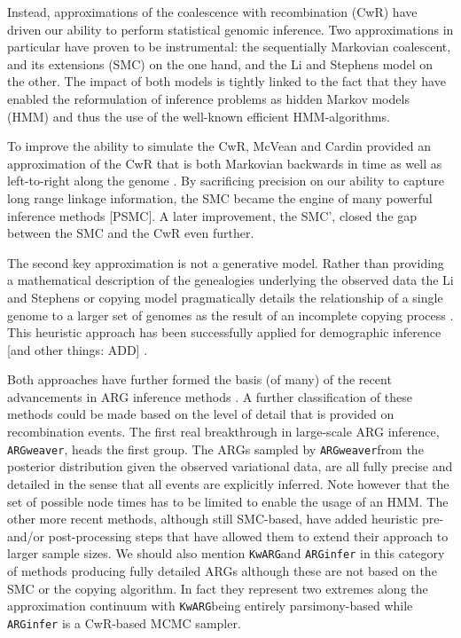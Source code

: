 \documentclass{article}
\newcommand{\kwarg}[0]{\texttt{KwARG}}
\newcommand{\argweaver}[0]{\texttt{ARGweaver}}
\begin{document}
Instead, approximations of the coalescence with recombination (CwR) have
driven our ability to perform statistical genomic inference. Two approximations
in particular have proven to be instrumental: the sequentially Markovian coalescent,
and its extensions (SMC) on the one hand, and the Li and Stephens model on the other.
The impact of both models is tightly linked to the fact that they have enabled
the reformulation of inference problems as hidden Markov models (HMM) and thus
the use of the well-known efficient HMM-algorithms.

To improve the ability to simulate the CwR, McVean and Cardin
provided an approximation of the CwR that is both Markovian backwards in time
as well as left-to-right along the genome \citep{mcvean_approximating_2005}.
By sacrificing precision on our ability to capture long range linkage
information, the SMC became the engine of many powerful inference methods [PSMC].
A later improvement, the SMC', closed the gap between the SMC and the
CwR even further.

The second key approximation is not a generative model. Rather than providing
a mathematical description of the genealogies underlying the observed data
the Li and Stephens or copying model pragmatically details the relationship
of a single genome to a larger set of genomes as the result of an
incomplete copying process \citep{li_modeling_2003}. This heuristic approach
has been successfully applied for demographic inference [and other things: ADD]
\citep{sheehan_estimating_2013, steinrucken_inference_2019}.

Both approaches have further formed the basis (of many) of the recent advancements in
ARG inference methods \citep{rasmussen_genome-wide_2014, heine_bridging_2018,
kelleher_inferring_2019, speidel_method_2019, rasmussen_espalier_2022, zhang_biobank-scale_2023}.
A further classification of these methods could be made based on the level of detail
that is provided on recombination events. The first real breakthrough in large-scale
ARG inference, \argweaver, heads the first group.
The ARGs sampled by \argweaver from the posterior distribution
given the observed variational data, are all fully precise and detailed in the sense
that all events are explicitly inferred. Note however that the set of possible node times
has to be limited to enable the usage of an HMM. The other more recent methods, although
still SMC-based, have added heuristic pre- and/or post-processing steps
that have allowed them to extend their approach to larger sample sizes. We should also
mention \kwarg and \texttt{ARGinfer} in this category of methods producing fully detailed ARGs
although these are not based on the SMC or the copying algorithm. In fact they represent
two extremes along the approximation continuum with \kwarg being entirely
parsimony-based while \texttt{ARGinfer} is a CwR-based MCMC sampler.
\end{document}
